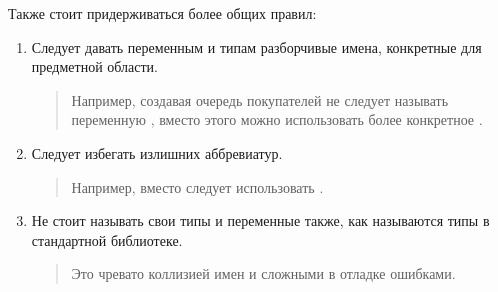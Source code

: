 Также стоит придерживаться более общих правил:

\begin{enumerate}
\item
  Следует давать переменным и типам разборчивые имена, конкретные для
  предметной области.

\begin{quote}
Например, создавая очередь покупателей не следует называть переменную
, вместо этого можно использовать более конкретное
.
\end{quote}

\item
  Следует избегать излишних аббревиатур.

\begin{quote}
Например, вместо  следует использовать
.
\end{quote}

\item
  Не стоит называть свои типы и переменные также, как называются типы в
  стандартной библиотеке.
  
  \begin{quote}
    Это чревато коллизией имен и сложными в отладке ошибками.
  \end{quote}
\end{enumerate}
